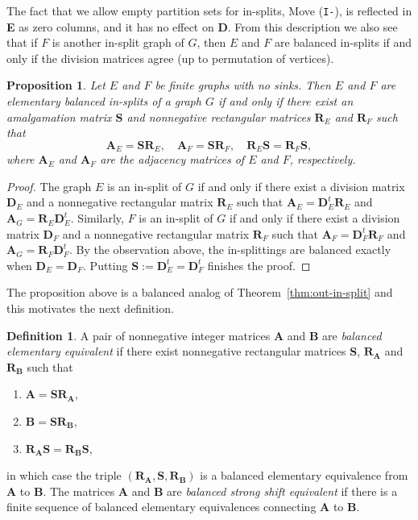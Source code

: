 \documentclass[12pt,a4paper,oneside,reqno,final]{amsart}
\newtheorem{proposition}[lemma]{Proposition}
\theoremstyle{definition}
\newtheorem{definition}[lemma]{Definition}
\numberwithin{equation}{section} %
\begin{document}
The fact that we allow empty partition sets for in-splits, Move (\texttt{I-}), is reflected in \textbf{E} as zero columns, and it has no effect on \textbf{D}.
From this description we also see that if $F$ is another in-split graph of $G$, then $E$ and $F$ are balanced in-splits if and only if the division matrices agree (up to permutation of vertices).


\begin{proposition}\label{prop:balanced-elementary-eq}
    Let $E$ and $F$ be finite graphs with no sinks.
    Then $E$ and $F$ are elementary balanced in-splits of a graph $G$ if and only if there exist an amalgamation matrix $\mathbf{S}$ and nonnegative rectangular matrices $\mathbf{R}_E$ and $\mathbf{R}_F$
    such that
    \[
        \mathbf{A}_E = \mathbf{S}\mathbf{R}_E, \quad
        \mathbf{A}_F = \mathbf{S}\mathbf{R}_F, \quad
        \mathbf{R}_E \mathbf{S} = \mathbf{R}_F \mathbf{S},
    \]
    where $\textbf{A}_E$ and $\textbf{A}_F$ are the adjacency matrices of $E$ and $F$, respectively.
\end{proposition}

\begin{proof}
    The graph $E$ is an in-split of $G$ if and only if there exist a division matrix $\textbf{D}_E$ and a nonnegative rectangular matrix $\textbf{R}_E$ such that
    $\textbf{A}_E = \textbf{D}_E^t \textbf{R}_E$ and $\textbf{A}_G = \textbf{R}_E \textbf{D}_E^t$.
    Similarly, $F$ is an in-split of $G$ if and only if there exist a division matrix $\textbf{D}_F$ and a nonnegative rectangular matrix $\textbf{R}_F$ such that
    $\textbf{A}_F = \textbf{D}_F^t \textbf{R}_F$ and $\textbf{A}_G = \textbf{R}_F \textbf{D}_F^t$.
    By the observation above, the in-splittings are balanced exactly when $\textbf{D}_E = \textbf{D}_F$.
    Putting $\textbf{S} := \textbf{D}_E^t = \textbf{D}_F^t$ finishes the proof.
\end{proof}

The proposition above is a balanced analog of Theorem~\ref{thm:out-in-split} and this motivates the next definition.

\begin{definition}
    A pair of nonnegative integer matrices \textbf{A} and \textbf{B} are \emph{balanced elementary equivalent} if there exist 
    nonnegative rectangular matrices \textbf{S}, $\textbf{R}_\textbf{A}$ and $\textbf{R}_\textbf{B}$ such that
    \begin{enumerate}
        \item[(i)] $\textbf{A} = \textbf{S} \textbf{R}_\textbf{A}$,
        \item[(ii)] $\textbf{B} = \textbf{S} \textbf{R}_\textbf{B}$, 
        \item[(iii)] $\textbf{R}_\textbf{A} \textbf{S} = \textbf{R}_\textbf{B} \textbf{S}$,
    \end{enumerate}
    in which case the triple $(\textbf{R}_\textbf{A},\textbf{S}, \textbf{R}_\textbf{B})$ is a balanced elementary equivalence from \textbf{A} to \textbf{B}.
    The matrices \textbf{A} and \textbf{B} are \emph{balanced strong shift equivalent} if there is a finite sequence of balanced elementary equivalences connecting \textbf{A} to \textbf{B}.
\end{definition}
\end{document}

